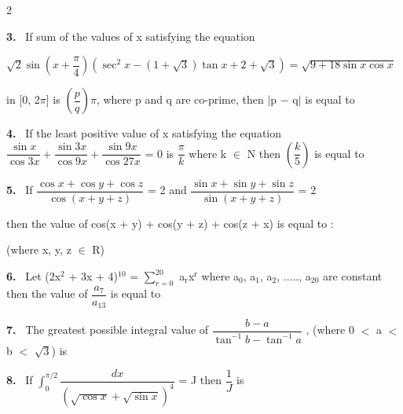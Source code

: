 \documentclass[10pt]{extarticle}
\newcommand{\qn}[1]{\par\smallskip\noindent\textbf{#1.}~}
\begin{document}
\begin{multicols}{2}
\qn{3} If sum of the values of x satisfying the equation\par
$\sqrt2\sin\left(x+\dfrac\pi4\right)\left(\sec^2x-(1+\sqrt3)\tan x+2+\sqrt3\right)=\sqrt{9+18\sin x\cos x}$\par
in [0, 2$\pi$] is $\left(\dfrac pq\right)\pi$, where p and q are co-prime, then $|$p $-$ q$|$ is equal to
\qn{4} If the least positive value of x satisfying the equation $\dfrac{\sin x}{\cos3x}+\dfrac{\sin3x}{\cos9x}+\dfrac{\sin9x}{\cos27x}$ = 0 is $\dfrac\pi k$ where k $\in$ N then $\left(\dfrac k5\right)$ is equal to
\qn{5} If $\dfrac{\cos x+\cos y+\cos z}{\cos(x+y+z)}$ = 2 and $\dfrac{\sin x+\sin y+\sin z}{\sin(x+y+z)}$ = 2\par
then the value of cos(x + y) + cos(y + z) + cos(z + x) is equal to :\par
(where x, y, z $\in$ R)
\qn{6} Let (2x$^2$ + 3x + 4)$^{10}$ = $\displaystyle\sum_{r=0}^{20}$ a$_\mathrm r$x$^\mathrm r$ where a$_0$, a$_1$, a$_2$, ....., a$_{20}$ are constant then the value of $\dfrac{a_7}{a_{13}}$ is equal to
\qn{7} The greatest possible integral value of $\dfrac{b-a}{\tan^{-1}b-\tan^{-1}a}$ , (where 0 $<$ a $<$ b $<$ $\sqrt3$) is
\qn{8} If $\displaystyle\int_0^{\pi/2}\dfrac{dx}{\left(\sqrt{\cos x}+\sqrt{\sin x}\right)^4}$ = J then $\dfrac1J$ is
\end{multicols}
\end{document}
